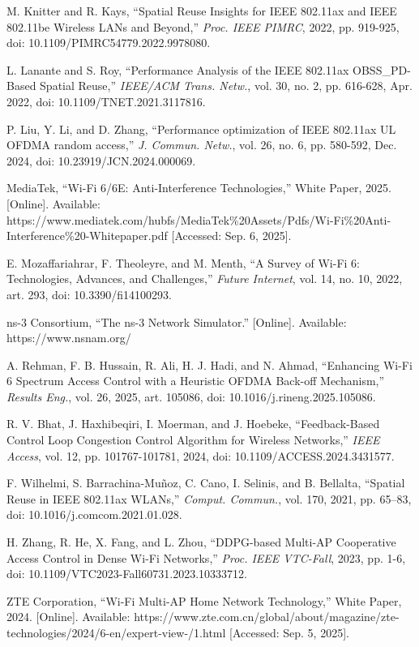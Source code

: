 \documentclass[12pt]{article}
\begin{document}
\begin{enumerate}[label={[\arabic*]}, leftmargin=*, itemsep=1em]
\item M. Knitter and R. Kays, ``Spatial Reuse Insights for IEEE 802.11ax and IEEE 802.11be Wireless LANs and Beyond,'' \textit{Proc. IEEE PIMRC}, 2022, pp. 919-925, doi: 10.1109/PIMRC54779.2022.9978080.

\item L. Lanante and S. Roy, ``Performance Analysis of the IEEE 802.11ax OBSS\_PD-Based Spatial Reuse,'' \textit{IEEE/ACM Trans. Netw.}, vol. 30, no. 2, pp. 616-628, Apr. 2022, doi: 10.1109/TNET.2021.3117816.

\item P. Liu, Y. Li, and D. Zhang, ``Performance optimization of IEEE 802.11ax UL OFDMA random access,'' \textit{J. Commun. Netw.}, vol. 26, no. 6, pp. 580-592, Dec. 2024, doi: 10.23919/JCN.2024.000069.

\item MediaTek, ``Wi-Fi 6/6E: Anti-Interference Technologies,'' White Paper, 2025. [Online]. Available: https://www.mediatek.com/hubfs/MediaTek\%20Assets/Pdfs/Wi-Fi\%20Anti-Interference\%20-Whitepaper.pdf [Accessed: Sep. 6, 2025].

\item E. Mozaffariahrar, F. Theoleyre, and M. Menth, ``A Survey of Wi-Fi 6: Technologies, Advances, and Challenges,'' \textit{Future Internet}, vol. 14, no. 10, 2022, art. 293, doi: 10.3390/fi14100293.

\item ns-3 Consortium, ``The ns-3 Network Simulator.'' [Online]. Available: https://www.nsnam.org/

\item A. Rehman, F. B. Hussain, R. Ali, H. J. Hadi, and N. Ahmad, ``Enhancing Wi-Fi 6 Spectrum Access Control with a Heuristic OFDMA Back-off Mechanism,'' \textit{Results Eng.}, vol. 26, 2025, art. 105086, doi: 10.1016/j.rineng.2025.105086.

\item R. V. Bhat, J. Haxhibeqiri, I. Moerman, and J. Hoebeke, ``Feedback-Based Control Loop Congestion Control Algorithm for Wireless Networks,'' \textit{IEEE Access}, vol. 12, pp. 101767-101781, 2024, doi: 10.1109/ACCESS.2024.3431577.

\item F. Wilhelmi, S. Barrachina-Muñoz, C. Cano, I. Selinis, and B. Bellalta, ``Spatial Reuse in IEEE 802.11ax WLANs,'' \textit{Comput. Commun.}, vol. 170, 2021, pp. 65–83, doi: 10.1016/j.comcom.2021.01.028.

\item H. Zhang, R. He, X. Fang, and L. Zhou, ``DDPG-based Multi-AP Cooperative Access Control in Dense Wi-Fi Networks,'' \textit{Proc. IEEE VTC-Fall}, 2023, pp. 1-6, doi: 10.1109/VTC2023-Fall60731.2023.10333712.

\item ZTE Corporation, ``Wi-Fi Multi-AP Home Network Technology,'' White Paper, 2024. [Online]. Available: https://www.zte.com.cn/global/about/magazine/zte-technologies/2024/6-en/expert-view-/1.html [Accessed: Sep. 5, 2025].


\end{enumerate}
\end{document}
